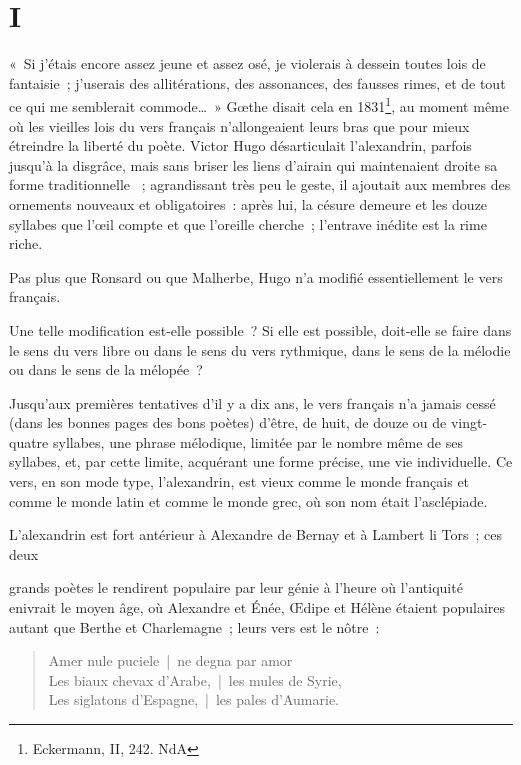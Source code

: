 \documentclass[french,twoside]{book} %
\begin{document}
\section[{I}]{I}
\noindent « Si j’étais encore assez jeune et assez osé, je violerais à dessein toutes lois de fantaisie ; j’userais des allitérations, des assonances, des fausses rimes, et de tout ce qui me semblerait commode… » Gœthe disait cela en 1831\footnote{Eckermann, II, 242. NdA}, au moment même où les vieilles lois du vers français n’allongeaient leurs bras que pour mieux étreindre la liberté du poète. Victor Hugo désarticulait l’alexandrin, parfois jusqu’à la disgrâce, mais sans briser les liens d’airain qui maintenaient droite sa forme traditionnelle  ; agrandissant très peu le geste, il ajoutait aux membres des ornements nouveaux et obligatoires : après lui, la césure demeure et les douze syllabes que l’œil compte et que l’oreille cherche ; l’entrave inédite est la rime riche.\par
Pas plus que Ronsard ou que Malherbe, Hugo n’a modifié essentiellement le vers français.\par
Une telle modification est-elle possible ? Si elle est possible, doit-elle se faire dans le sens du vers libre ou dans le sens du vers rythmique, dans le sens de la mélodie ou dans le sens de la mélopée ?\par
Jusqu’aux premières tentatives d’il y a dix ans, le vers français n’a jamais cessé (dans les bonnes pages des bons poètes) d’être, de huit, de douze ou de vingt-quatre syllabes, une phrase mélodique, limitée par le nombre même de ses syllabes, et, par cette limite, acquérant une forme précise, une vie individuelle. Ce vers, en son mode type, l’alexandrin, est vieux comme le monde français et comme le monde latin et comme le monde grec, où son nom était l’asclépiade.\par
L’alexandrin est fort antérieur à Alexandre de Bernay et à Lambert li Tors ; ces deux\par
grands poètes le rendirent populaire par leur génie à l’heure où l’antiquité enivrait le moyen âge, où Alexandre et Énée, Œdipe et Hélène étaient populaires autant que Berthe et Charlemagne ; leurs vers est le nôtre :\par


\begin{verse}
Amer nule puciele | ne degna par amor\\
Les biaux chevax d’Arabe, | les mules de Syrie,\\
Les siglatons d’Espagne, | les pales d’Aumarie.\\
\end{verse}
\end{document}
